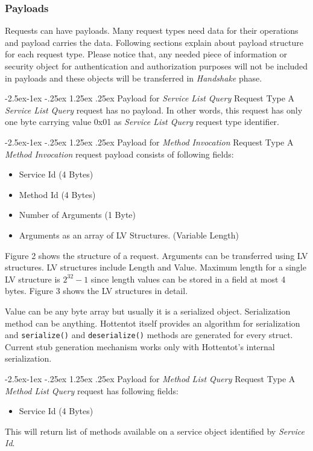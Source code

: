 \documentclass[10pt,a4paper]{article}
\makeatletter
\renewcommand\paragraph{\@startsection{paragraph}{4}{\z@}%
            {-2.5ex\@plus -1ex \@minus -.25ex}%
            {1.25ex \@plus .25ex}%
            {\normalfont\normalsize\bfseries}}
\makeatother
\begin{document}
\subsubsection{Payloads}
Requests can have payloads. Many request types need data for their operations and payload carries the data. Following sections explain about payload structure for each request type. Please notice that, any needed piece of information or security object for authentication and authorization purposes will not be included in payloads and these objects will be transferred in \textit{Handshake} phase.

\paragraph{Payload for \textit{Service List Query} Request Type}
A \textit{Service List Query} request has no payload. In other words, this request has only one byte carrying value 0x01 as \textit{Service List Query} request type identifier.

\paragraph{Payload for \textit{Method Invocation} Request Type}
A \textit{Method Invocation} request payload consists of following fields:
\begin{itemize}
  \item Service Id (4 Bytes)
  \item Method Id (4 Bytes)
  \item Number of Arguments (1 Byte)
  \item Arguments as an array of LV Structures. (Variable Length)
\end{itemize}

Figure 2 shows the structure of a request. Arguments can be transferred using LV structures. LV structures include Length and Value. Maximum length for a single LV structure is $2^{32} - 1$ since length values can be stored in a field at most 4 bytes. Figure 3 shows the LV structures in detail.

Value can be any byte array but usually it is a serialized object. Serialization method can be anything. Hottentot itself provides an algorithm for serialization and \texttt {serialize()} and \texttt {deserialize()} methods are generated for every struct. Current stub generation mechanism works only with Hottentot's internal serialization.

\paragraph{Payload for \textit{Method List Query} Request Type} 
A \textit{Method List Query} request has following fields:
\begin{itemize}
  \item Service Id (4 Bytes)
\end{itemize}
This will return list of methods available on a service object identified by \textit{Service Id}.
\end{document}
